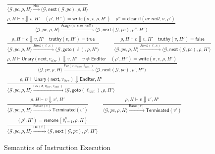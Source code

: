 \begin{figure*}[t]
\centering
\[
\begin{array}{c}
\frac{}{\langle \mathcal{G},pc,\rho,H \rangle \xrightarrow{\mathsf{Nop}} 
        \langle \mathcal{G},\mathsf{next}(\mathcal{G},pc),\rho,H \rangle}
\\[2ex]
\frac{\rho,H \vdash e \Downarrow v,H' \quad 
      (\rho',H'') = \mathsf{write}(\sigma,v,\rho,H') \quad
      \rho'' = \mathsf{clear\_if}(or\_null,\sigma,\rho')}
     {\langle \mathcal{G},pc,\rho,H \rangle \xrightarrow{\mathsf{Assign}(\sigma,e,or\_null)} 
      \langle \mathcal{G},\mathsf{next}(\mathcal{G},pc),\rho'',H'' \rangle}
\\[2ex]
\frac{\rho,H \vdash c \Downarrow v,H' \quad \mathsf{truthy}(v,H') = \mathsf{true}}
     {\langle \mathcal{G},pc,\rho,H \rangle \xrightarrow{\mathsf{Jump}(\ell,c)} 
      \langle \mathcal{G},\mathsf{goto}(\ell),\rho,H' \rangle}
\qquad
\frac{\rho,H \vdash c \Downarrow v,H' \quad \mathsf{truthy}(v,H') = \mathsf{false}}
     {\langle \mathcal{G},pc,\rho,H \rangle \xrightarrow{\mathsf{Jump}(\ell,c)} 
      \langle \mathcal{G},\mathsf{next}(\mathcal{G},pc),\rho,H' \rangle}
\\[2ex]
\frac{\rho,H \vdash \mathsf{Unary}(\mathsf{next},v_{\mathit{iter}}) \Downarrow v,H' \quad
      v \neq \mathsf{EndIter} \quad
      (\rho',H'') = \mathsf{write}(\sigma,v,\rho,H')}
     {\langle \mathcal{G},pc,\rho,H \rangle \xrightarrow{\mathsf{For}(\sigma,v_{\mathit{iter}},\ell_{\mathit{exit}})} 
      \langle \mathcal{G},\mathsf{next}(\mathcal{G},pc),\rho',H'' \rangle}
\\[1.5ex]
\frac{\rho,H \vdash \mathsf{Unary}(\mathsf{next},v_{\mathit{iter}}) \Downarrow \mathsf{EndIter},H'}
     {\langle \mathcal{G},pc,\rho,H \rangle \xrightarrow{\mathsf{For}(\sigma,v_{\mathit{iter}},\ell_{\mathit{exit}})} 
      \langle \mathcal{G},\mathsf{goto}(\ell_{\mathit{exit}}),\rho,H' \rangle}
\\[2ex]
\frac{\rho,H \vdash v \Downarrow v',H'}
     {\langle \mathcal{G},pc,\rho,H \rangle \xrightarrow{\mathsf{Return}(v)} 
      \mathsf{Terminated}(v')}
\qquad
\frac{\rho,H \vdash v \Downarrow v',H'}
     {\langle \mathcal{G},pc,\rho,H \rangle \xrightarrow{\mathsf{Raise}(v)} 
      \mathsf{Terminated}(v')}
\\[2ex]
\frac{(\rho',H') = \mathsf{remove}(\overline{v}_{i=1}^{n},\rho,H)}
     {\langle \mathcal{G},pc,\rho,H \rangle \xrightarrow{\mathsf{Del}(\overline{v})} 
      \langle \mathcal{G},\mathsf{next}(\mathcal{G},pc),\rho',H' \rangle}
\end{array}
\]
\caption{Semantics of Instruction Execution}
\label{fig:instruction-semantics}
\end{figure*}

